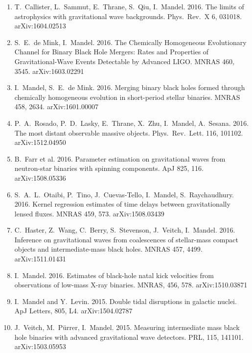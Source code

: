 \documentclass[margin,line]{res}
\begin{document}
\begin{resume}
\begin{enumerate}
\item T.~Callister, L.~Sammut, E.~Thrane, S.~Qiu, I.~Mandel.  2016. The limits of astrophysics with gravitational wave backgrounds. Phys.~Rev.~X 6, 031018.  arXiv:1604.02513

\item S.~E.~de Mink, I.~Mandel. 2016. The Chemically Homogeneous Evolutionary Channel for Binary Black Hole Mergers: Rates and Properties of Gravitational-Wave Events Detectable by Advanced LIGO.  MNRAS 460, 3545.  arXiv:1603.02291

\item I.~Mandel, S.~E.~de Mink.  2016.  Merging binary black holes formed through chemically homogeneous evolution in short-period stellar binaries. MNRAS 458, 2634. arXiv:1601.00007

\item P.~A.~Rosado, P.~D.~Lasky, E.~Thrane, X.~Zhu, I.~Mandel, A.~Sesana.  2016. The most distant observable massive objects.  Phys.~Rev.~Lett. 116, 101102.  arXiv:1512.04950

\item B.~Farr et al. 2016. Parameter estimation on gravitational waves from neutron-star binaries with spinning components. ApJ 825, 116. arXiv:1508.05336

\item S.~A.~L.~Otaibi, P.~Tino, J.~Cuevas-Tello, I.~Mandel, S.~Raychaudhury.  2016.  Kernel regression estimates of time delays between gravitationally lensed fluxes.  MNRAS 459, 573.  arXiv:1508.03439

\item C.~Haster, Z.~Wang, C.~Berry, S.~Stevenson, J.~Veitch, I.~Mandel.  2016. Inference on gravitational waves from coalescences of stellar-mass compact objects and intermediate-mass black holes.   MNRAS 457, 4499.  arXiv:1511.01431 

\item I.~Mandel. 2016. Estimates of black-hole natal kick velocities from observations of low-mass X-ray binaries. MNRAS, 456, 578. arXiv:1510.03871

\item  I.~Mandel and Y.~Levin.  2015.  Double tidal disruptions in galactic nuclei.  ApJ Letters, 805, L4.  arXiv:1504.02787

\item  J.~Veitch, M.~P\"urrer, I.~Mandel. 2015. Measuring intermediate mass black hole binaries with advanced gravitational wave detectors. PRL, 115, 141101. arXiv:1503.05953 


\end{enumerate}
\end{resume}
\end{document}
